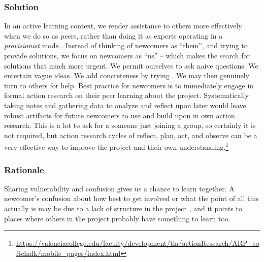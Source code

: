 \subsubsection*{Solution}

In an active learning context, we render assistance to others more effectively when we do
so as peers, rather than doing it as experts operating in a \emph{provisionist} mode
\cite{boud2005peer}.  Instead of thinking of newcomers as
``them'', and trying to provide solutions, we focus on newcomers as
``us'' -- which makes the search for solutions that much more urgent.
We permit ourselves to ask naive questions.  We entertain vague ideas.
We add concreteness by trying .  We may then genuinely turn
to others for help. 
Best practice for newcomers is to immediately engage in formal action research on their peer learning about the project. Systematically taking notes and gathering data to analyze and reflect upon later would leave robust artifacts for future newcomers to use and build upon in own action research. This is a lot to ask for a someone just joining a group, so certainly it is not required, but action research cycles of reflect, plan, act, and observe can be a very effective way to improve the project and their own understanding.\footnote{\url{https://valenciacollege.edu/faculty/development/tla/actionResearch/ARP_softchalk/mobile_pages/index.html}}

%
\subsubsection*{Rationale} 
%
Sharing vulnerability and confusion gives us a chance to learn
together.  A newcomer's confusion about how best to get involved or
what the point of all this actually is may be due to a lack of
structure in the project , and it points to
places where others in the project probably have something to learn too.
%

